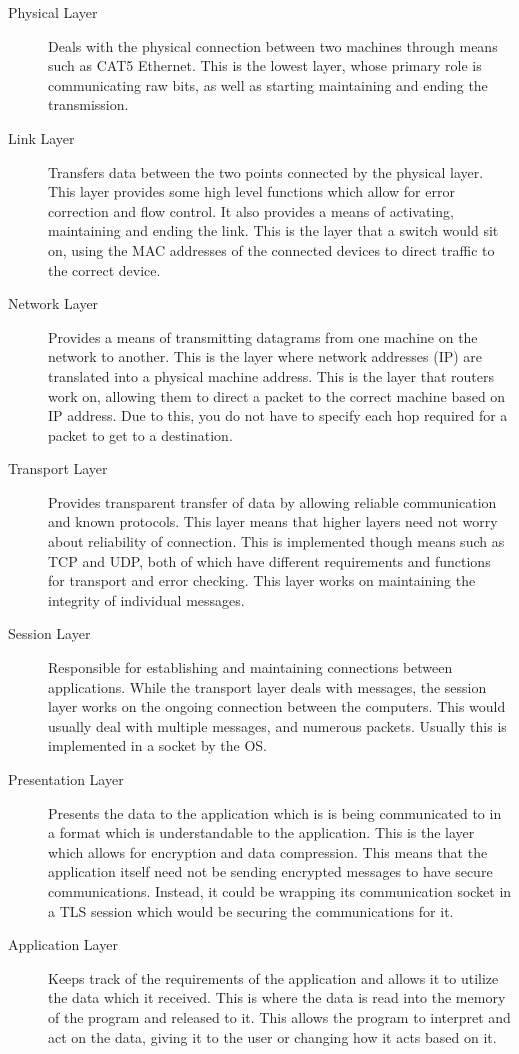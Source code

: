 \documentclass[a4paper,11pt]{report}
\begin{document}
		\begin{description}
			\item[Physical Layer]
				Deals with the physical connection between two machines through means such as CAT5 Ethernet. 
				This is the lowest layer, whose primary role is communicating raw bits, as well as starting maintaining and ending the transmission. 
			\item[Link Layer]
				Transfers data between the two points connected by the physical layer. 
				This layer provides some high level functions which allow for error correction and flow control. 
				It also provides a means of activating, maintaining and ending the link. 
				This is the layer that a switch would sit on, 
				using the MAC addresses of the connected devices to direct traffic to the correct device. 
			\item[Network Layer]
				Provides a means of transmitting datagrams from one machine on the network to another. 
				This is the layer where network addresses (IP) are translated into a physical machine address. 
				This is the layer that routers work on, allowing them to direct a packet to the correct machine based on IP address. 
				Due to this, you do not have to specify each hop required for a packet to get to a destination. 
			\item[Transport Layer]
				Provides transparent transfer of data by allowing reliable communication and known protocols. 
				This layer means that higher layers need not worry about reliability of connection. 
				This is implemented though means such as TCP and UDP, both of which have different requirements and functions for transport and error checking. 
				This layer works on maintaining the integrity of individual messages. 
			\item[Session Layer]
				Responsible for establishing and maintaining connections between applications. 
				While the transport layer deals with messages, the session layer works on the ongoing connection between the computers. 
				This would usually deal with multiple messages, and numerous packets. 
				Usually this is implemented in a socket by the OS. 
			\item[Presentation Layer]
				Presents the data to the application which is is being communicated to in a format which is understandable to the application. 
				This is the layer which allows for encryption and data compression. 
				This means that the application itself need not be sending encrypted messages to have secure communications. 
				Instead, it could be wrapping its communication socket in a TLS session which would be securing the communications for it. 
			\item[Application Layer] 
				Keeps track of the requirements of the application and allows it to utilize the data which it received. 
				This is where the data is read into the memory of the program and released to it. 
				This allows the program to interpret and act on the data, giving it to the user or changing how it acts based on it. 
		\end{description}
\end{document}
